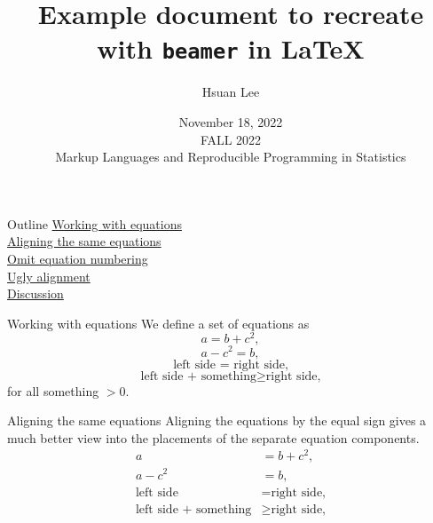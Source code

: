 \documentclass[11pt, aspectratio=169]{beamer}
\begin{document}
	
	\title{Example document to recreate with \texttt{beamer} in \LaTeX}
	\author{Hsuan Lee}
	\date{
		November 18, 2022 \\
		\vspace{1.5cm} \large FALL 2022 \\
		\large Markup Languages and Reproducible Programming in Statistics
	}
	
	\maketitle

	\begin{frame}{Outline}
	\hyperlink{working}{Working with equations} \\
	\hspace{5mm} \hyperlink{aligning}{Aligning the same equations} \\
	\hspace{5mm} \hyperlink{omit}{Omit equation numbering} \\
	\hspace{5mm} \hyperlink{ugly}{Ugly alignment} \\
	\vspace{10mm}
	\hyperlink{discussion}{Discussion}
\end{frame}

\begin{frame}[label=working]{Working with equations}
	We define a set of equations as
	\begin{equation} a = b + c^2, \end{equation}
	\begin{equation} a - c^2 = b, \end{equation}
	\begin{equation} \text{left side = right side,} \end{equation}
	\begin{equation} \text{left side + something} \geq \text{right side,} \end{equation}
	for all something $> 0$.
\end{frame}

\begin{frame}[label=aligning]{Aligning the same equations}
	Aligning the equations by the equal sign gives a much better view into the placements of the separate equation components.
	\begin{align}
		a &= b + c^2, \\
		a - c^2 &= b, \\
		\text{left side} &= \text{right side,} \\
		\text{left side + something} &\geq \text{right side,}
	\end{align}
\end{frame}
\end{document}
